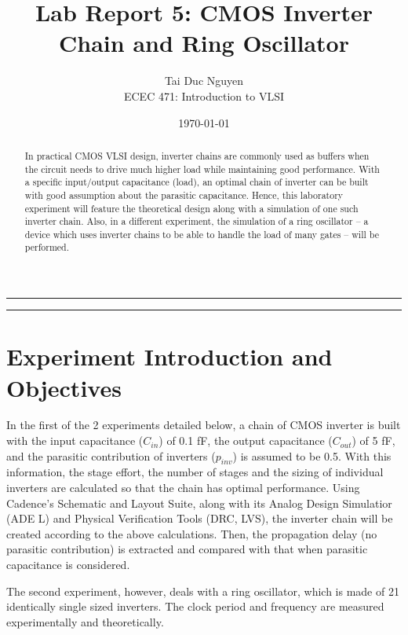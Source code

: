 \documentclass[letterpaper, 11pt]{article}
\title{Lab Report 5: CMOS Inverter Chain and Ring Oscillator}
\author{
Tai Duc Nguyen \\
ECEC 471: Introduction to VLSI
}
\date{\today}
\begin{document}
\maketitle




\rule{\textwidth}{1pt}

\begin{abstract}
	In practical CMOS VLSI design, inverter chains are commonly used as buffers when the circuit needs to drive much higher load while maintaining good performance. With a specific input/output capacitance (load), an optimal chain of inverter can be built with good assumption about the parasitic capacitance. Hence, this laboratory experiment will feature the theoretical design along with a simulation of one such inverter chain. Also, in a different experiment, the simulation of a ring oscillator -- a device which uses inverter chains to be able to handle the load of many gates -- will be performed.
\end{abstract}

\rule{\textwidth}{1pt}

\section{Experiment Introduction and Objectives}
\label{sec:intro}

In the first of the 2 experiments detailed below, a chain of CMOS inverter is built with the input capacitance ($C_{in}$) of 0.1 fF, the output capacitance ($C_{out}$) of 5 fF, and the parasitic contribution of inverters ($p_{inv}$) is assumed to be 0.5. With this information, the stage effort, the number of stages and the sizing of individual inverters are calculated so that the chain has optimal performance. Using Cadence's Schematic and Layout Suite, along with its Analog Design Simulatior (ADE L) and Physical Verification Tools (DRC, LVS), the inverter chain will be created according to the above calculations. Then, the propagation delay (no parasitic contribution) is extracted and compared with that when parasitic capacitance is considered. 

The second experiment, however, deals with a ring oscillator, which is made of 21 identically single sized inverters. The clock period and frequency are measured experimentally and theoretically.
\end{document}
